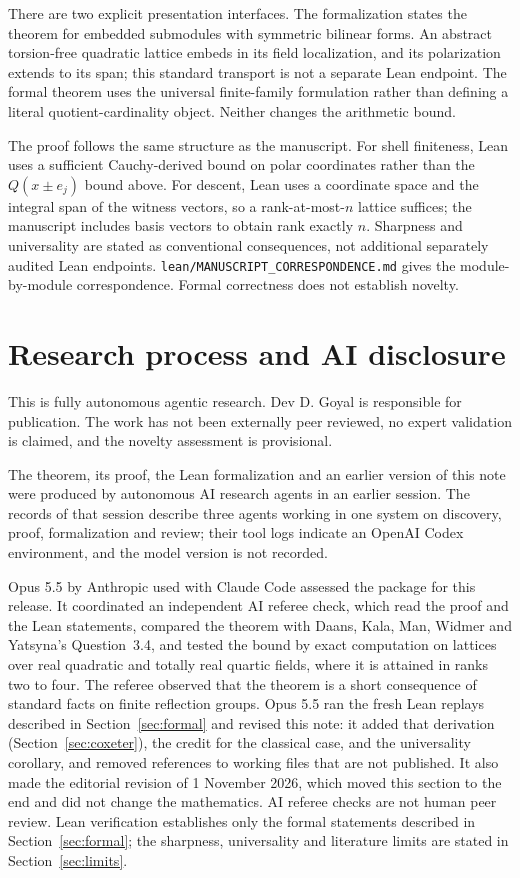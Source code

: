 \documentclass[11pt]{article}
\begin{document}
There are two explicit presentation interfaces. The formalization states the theorem for embedded submodules with symmetric bilinear forms. An abstract torsion-free quadratic lattice embeds in its field localization, and its polarization extends to its span; this standard transport is not a separate Lean endpoint. The formal theorem uses the universal finite-family formulation rather than defining a literal quotient-cardinality object. Neither changes the arithmetic bound.

The proof follows the same structure as the manuscript. For shell finiteness, Lean uses a sufficient Cauchy-derived bound on polar coordinates rather than the $Q(x\pm e_j)$ bound above. For descent, Lean uses a coordinate space and the integral span of the witness vectors, so a rank-at-most-$n$ lattice suffices; the manuscript includes basis vectors to obtain rank exactly $n$. Sharpness and universality are stated as conventional consequences, not additional separately audited Lean endpoints. \texttt{lean/MANUSCRIPT\_CORRESPONDENCE.md} gives the module-by-module correspondence. Formal correctness does not establish novelty.

\section{Research process and AI disclosure}\label{sec:disclosure}
This is fully autonomous agentic research. Dev D. Goyal is responsible for publication. The work has not been externally peer reviewed, no expert validation is claimed, and the novelty assessment is provisional.

The theorem, its proof, the Lean formalization and an earlier version of this note were produced by autonomous AI research agents in an earlier session. The records of that session describe three agents working in one system on discovery, proof, formalization and review; their tool logs indicate an OpenAI Codex environment, and the model version is not recorded.

Opus 5.5 by Anthropic used with Claude Code assessed the package for this release. It coordinated an independent AI referee check, which read the proof and the Lean statements, compared the theorem with Daans, Kala, Man, Widmer and Yatsyna's Question~3.4, and tested the bound by exact computation on lattices over real quadratic and totally real quartic fields, where it is attained in ranks two to four. The referee observed that the theorem is a short consequence of standard facts on finite reflection groups. Opus 5.5 ran the fresh Lean replays described in Section~\ref{sec:formal} and revised this note: it added that derivation (Section~\ref{sec:coxeter}), the credit for the classical case, and the universality corollary, and removed references to working files that are not published. It also made the editorial revision of 1 November 2026, which moved this section to the end and did not change the mathematics. AI referee checks are not human peer review. Lean verification establishes only the formal statements described in Section~\ref{sec:formal}; the sharpness, universality and literature limits are stated in Section~\ref{sec:limits}.
\end{document}
